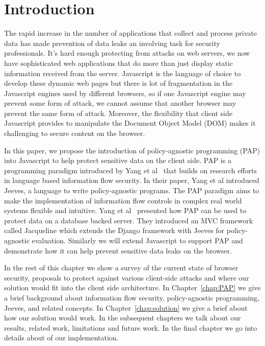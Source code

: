 \chapter{Introduction\label{chap:intro}}

The rapid increase in the number of applications that collect and process private
data has made prevention of data leaks an involving task for security professionals.
It's hard enough protecting from attacks on web servers, we now have sophisticated
web applications that do more than just display static information received from
the server. Javascript is the language of choice to develop these dynamic web pages
but there is lot of fragmentation in the Javascript engines used by different browsers,
so if one Javascript engine may prevent some form of attack, we cannot assume
that another browser may prevent the same form of attack. Moreover, the flexibility
that client side Javascript provides to manipulate the Document Object Model (DOM)
makes it challenging to secure content on the browser.

In this paper, we propose the introduction of policy-agnostic programming (PAP)
into Javascript to help protect sensitive data on the client side. PAP is a
programming paradigm introduced by Yang et al~\cite{Jeeves} that builds on
research efforts in language based information flow security. In their paper,
Yang et al introduced Jeeves, a language to write policy-agnostic programs. The
PAP paradigm aims to make the implementation of information flow controls in complex
real world systems flexible and intuitive. Yang et al~\cite{Jacqueline} presented
how PAP can be used to protect data on a database backed server. They introduced
an MVC framework called Jacqueline which extends the Django framework with Jeeves
for policy-agnostic evaluation. Similarly we will extend Javascript to support PAP
and demonstrate how it can help prevent sensitive data leaks on the browser.

In the rest of this chapter we show a survey of the current state of browser security,
proposals to protect against various client-side attacks and where our solution
would fit into the client side architecture. In Chapter~\ref{chap:PAP} we give a brief background
about information flow security, policy-agnostic programming, Jeeves, and related
concepts. In Chapter~\ref{chap:solution} we give a brief about how our solution would work. In the
subsequent chapters we talk about our results, related work, limitations and future
work. In the final chapter we go into details about of our implementation.

